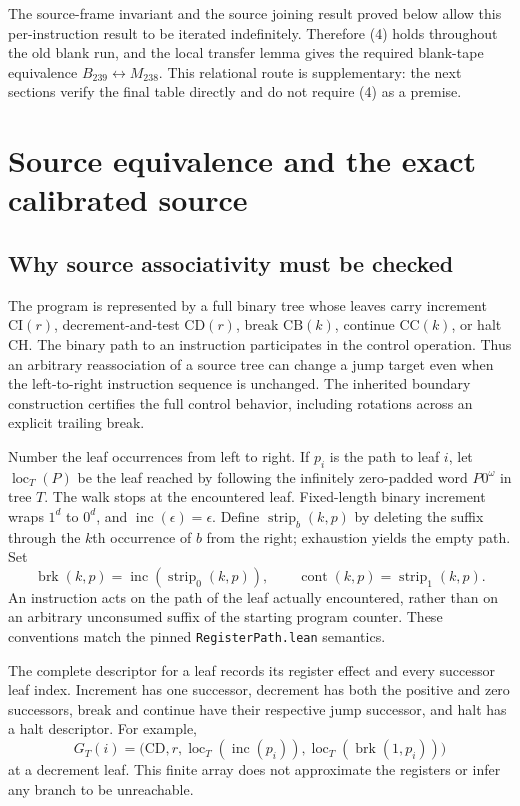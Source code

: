 \documentclass[11pt]{article}
\theoremstyle{definition}\newtheorem{definition}[theorem]{Definition}
\newcommand{\loc}{\operatorname{loc}}
\newcommand{\inc}{\operatorname{inc}}
\newcommand{\strip}{\operatorname{strip}}
\newcommand{\brk}{\operatorname{brk}}
\newcommand{\cont}{\operatorname{cont}}
\newcommand{\file}[1]{\nolinkurl{#1}}
\begin{document}
The source-frame invariant and the source joining result proved below
allow this per-instruction result to be iterated indefinitely.  Therefore
(4) holds throughout the old blank run, and the local transfer lemma gives
the required blank-tape equivalence $B_{239}\leftrightarrow M_{238}$.
This relational route is supplementary: the next sections verify the final
table directly and do not require (4) as a premise.

\section{Source equivalence and the exact calibrated source}
\label{sec:source}

\subsection{Why source associativity must be checked}

The program is represented by a full binary tree whose leaves carry
increment $\mathrm{CI}(r)$, decrement-and-test $\mathrm{CD}(r)$,
break $\mathrm{CB}(k)$, continue $\mathrm{CC}(k)$, or halt
$\mathrm{CH}$.  The binary path to an instruction participates in the
control operation.  Thus an arbitrary reassociation of a source tree can
change a jump target even when the left-to-right instruction sequence is
unchanged.  The inherited boundary construction certifies the full control
behavior, including rotations across an explicit trailing break.

Number the leaf occurrences from left to right.  If $p_i$ is the path to
leaf $i$, let $\loc_T(P)$ be the leaf reached by following the infinitely
zero-padded word $P0^\omega$ in tree $T$.  The walk stops at the encountered
leaf.  Fixed-length binary increment wraps $1^d$ to $0^d$, and
$\inc(\epsilon)=\epsilon$.  Define $\strip_b(k,p)$ by deleting the suffix
through the $k$th occurrence of $b$ from the right; exhaustion yields the
empty path.  Set
\[
 \brk(k,p)=\inc(\strip_0(k,p)),\qquad
 \cont(k,p)=\strip_1(k,p).
\]
An instruction acts on the path of the leaf actually encountered, rather
than on an arbitrary unconsumed suffix of the starting program counter.
These conventions match the pinned \file{RegisterPath.lean} semantics.

The complete descriptor for a leaf records its register effect and every
successor leaf index.  Increment has one successor, decrement has both the
positive and zero successors, break and continue have their respective
jump successor, and halt has a halt descriptor.  For example,
\[
 G_T(i)=\bigl(\mathrm{CD},r,
 \loc_T(\inc(p_i)),\loc_T(\brk(1,p_i))\bigr)
\]
at a decrement leaf.  This finite array does not approximate the registers
or infer any branch to be unreachable.
\end{document}
